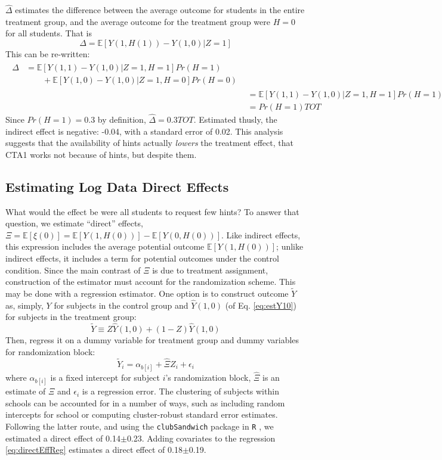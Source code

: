 \documentclass{article}\usepackage[]{graphicx}\usepackage[]{color}
\newcommand{\EE}{\mathbb{E}}
\begin{document}
$\hat{\Delta}$ estimates the difference between the average outcome
for students in the entire treatment group, and the average outcome
for the treatment group were $H=0$ for all students.
That is
\begin{equation*}
\Delta=\EE[Y(1,H(1))-Y(1,0)|Z=1]
\end{equation*}
This can be re-written:
\begin{align*}
\begin{split}
\Delta&=\EE[Y(1,1)-Y(1,0)|Z=1,H=1]Pr(H=1)\\
&\qquad +\EE[Y(1,0)-Y(1,0)|Z=1,H=0]Pr(H=0)
\end{split}
\\[2ex]
&=\EE[Y(1,1)-Y(1,0)|Z=1,H=1]Pr(H=1)\\
&=Pr(H=1)TOT
\end{align*}
Since $Pr(H=1)=$0.3 by definition,
$\hat{\Delta}=$0.3$TOT$.
Estimated thusly, the indirect effect is negative: -0.04, with
a standard error of 0.02.
This analysis suggests that the availability of hints
actually \emph{lowers} the treatment effect, that CTA1 works not
because of hints, but despite them.

\subsection{Estimating Log Data Direct Effects}\label{sec:directEst}

What would the effect be were all students to request few hints?
To answer that question, we estimate ``direct'' effects,
$\Xi=\EE[\xi(0)]=\EE[Y(1,H(0))]-\EE[Y(0,H(0))]$.
Like indirect effects, this expression includes the average potential
outcome $\EE[Y(1,H(0))]$; unlike indirect effects, it includes a term for
potential outcomes under the control condition.
Since the main contrast of $\Xi$ is due to treatment assignment,
construction of the estimator must account for the randomization
scheme.
This may be done with a regression estimator.
One option is to construct outcome $\tilde{Y}$ as, simply, $Y$ for
subjects in the control group and $\hat{Y}(1,0)$ (of Eq. \ref{eq:estY10}) for subjects in the
treatment group:
\begin{equation*}
\tilde{Y}\equiv Z\hat{Y}(1,0)+(1-Z)\hat{Y}(1,0)
\end{equation*}
Then, regress it on a dummy variable for treatment group and dummy
variables for randomization block:
\begin{equation}\label{eq:directEffReg}
\tilde{Y}_i=\alpha_{b[i]}+\hat{\Xi}Z_i+\epsilon_i
\end{equation}
where $\alpha_{b[i]}$ is a fixed intercept for subject $i$'s randomization block, $\hat{\Xi}$ is an estimate of $\Xi$ and $\epsilon_i$ is a regression error.
The clustering of subjects within schools can be accounted for in a
number of ways, such as including random intercepts for school or
computing cluster-robust standard error estimates.
Following the latter route, and using the \texttt{clubSandwich}
package in \texttt{R} \citep{clubsandwich}, we estimated a direct
effect of
0.14$\pm$0.23.
Adding covariates to the regression \eqref{eq:directEffReg} estimates a direct effect of
0.18$\pm$0.19.
\end{document}
